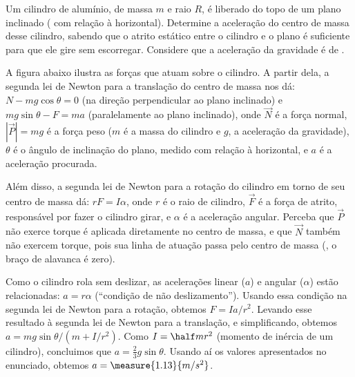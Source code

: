 \begin{question}\label{q:cilindro-desce-plano}
    Um cilindro de alumínio, de massa $m$ e raio $R$, é liberado do topo de um plano inclinado ( com relação à horizontal).
    Determine a aceleração do centro de massa desse cilindro, sabendo que o atrito estático entre o cilindro e o plano é suficiente para que ele gire sem escorregar.
    Considere que a aceleração da gravidade é de .

    \begin{answer}
    \end{answer}
    
    \begin{solution}
      A figura abaixo ilustra as forças que atuam sobre o cilindro.
      A partir dela, a segunda lei de Newton para a translação do centro de massa nos dá: $N - mg \cos\theta = 0$ (na direção perpendicular ao plano inclinado) e $mg \sin\theta - F = ma$ (paralelamente ao plano inclinado), onde $\vec N$ é a força normal, $|\vec P| = mg$ é a força peso ($m$ é a massa do cilindro e $g$, a aceleração da gravidade), $\theta$ é o ângulo de inclinação do plano, medido com relação à horizontal, e $a$ é a aceleração procurada.


      Além disso, a segunda lei de Newton para a rotação do cilindro em torno de seu centro de massa dá: $rF = I\alpha$, onde $r$ é o raio de cilindro, $\vec F$ é a força de atrito, responsável por fazer o cilindro girar, e $\alpha$ é a aceleração angular.
      Perceba que $\vec P$ não exerce torque é aplicada diretamente no centro de massa, e que $\vec N$ também não exercem torque, pois sua linha de atuação passa pelo centro de massa (\ie, o braço de alavanca é zero).

      Como o cilindro rola sem deslizar, as acelerações linear ($a$) e angular ($\alpha$) estão relacionadas: $a = r\alpha$ (``condição de não deslizamento'').
      Usando essa condição na segunda lei de Newton para a rotação, obtemos $F = Ia/r^2$.
      Levando esse resultado à segunda lei de Newton para a translação, e simplificando, obtemos $a = mg\sin\theta/(m + I/r^2)$.
      Como $I = \half m r^2$ (momento de inércia de um cilindro), concluimos que $a = \frac{2}{3} g \sin\theta$.
      Usando aí os valores apresentados no enunciado, obtemos $a = \measure{1.13}{m/s^2}$.
    \end{solution}
\end{question}